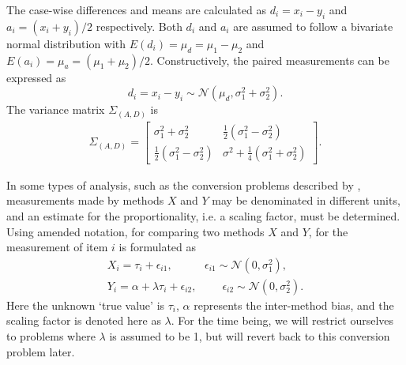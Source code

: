 \documentclass[12pt, a4paper]{report}
\theoremstyle{plain}
\theoremstyle{definition}
\theoremstyle{remark}
\begin{document}
The case-wise differences and means are calculated as $d_{i} =
x_{i}-y_{i}$ and $a_{i} = (x_{i}+y_{i})/2$  respectively.  Both
$d_{i}$ and $a_{i}$ are assumed to follow a bivariate normal
distribution with $E(d_{i})= \mu_{d} = \mu_{1} - \mu_{2}$ and
$E(a_{i})= \mu_{a} = (\mu_{1} + \mu_{2})/2$. Constructively, the paired measurements can be expressed as
\[ d_{i} = x_{i} - y_{i} \sim \mathcal{N} (\mu_d, \sigma^2_{1} + \sigma^2_{2}). \] The variance matrix
$\Sigma_{(A,D)}$ is
\begin{eqnarray}
\Sigma_{(A,D)}= \left[\begin{matrix}
\sigma^{2}_{1}+\sigma^{2}_{2}&\frac{1}{2}(\sigma^{2}_{1}-\sigma^{2}_{2})\\
\frac{1}{2}(\sigma^{2}_{1}-\sigma^{2}_{2})&\sigma^{2}+
\frac{1}{4}(\sigma^{2}_{1}+\sigma^{2}_{2})
\end{matrix} \right].
\end{eqnarray}


%	

In some types of analysis, such as the conversion problems described by \citet{lewis}, measurements made by methods $X$ and $Y$ may be denominated in different units, and an estimate for the proportionality, i.e. a scaling factor, must be determined. Using amended notation, for comparing two methods $X$ and $Y$, for the measurement of item $i$ is formulated as
\begin{eqnarray}
X_i = \tau_i + \epsilon_{i1}, \phantom{spacin} \epsilon_{i1} \sim \mathcal{N}(0,\sigma^2_1),\\
Y_i = \alpha + \lambda \tau_i + \epsilon_{i2}, \phantom{spaci}  \epsilon_{i2} \sim \mathcal{N}(0,\sigma^2_2).
\end{eqnarray}
Here the unknown `true value' is $\tau_i$, $\alpha$ represents the inter-method bias, and the scaling factor is denoted here as $\lambda$. For the time being, we will restrict ourselves to problems where $\lambda$ is assumed to be 1, but will revert back to this conversion problem later. 
\end{document}
